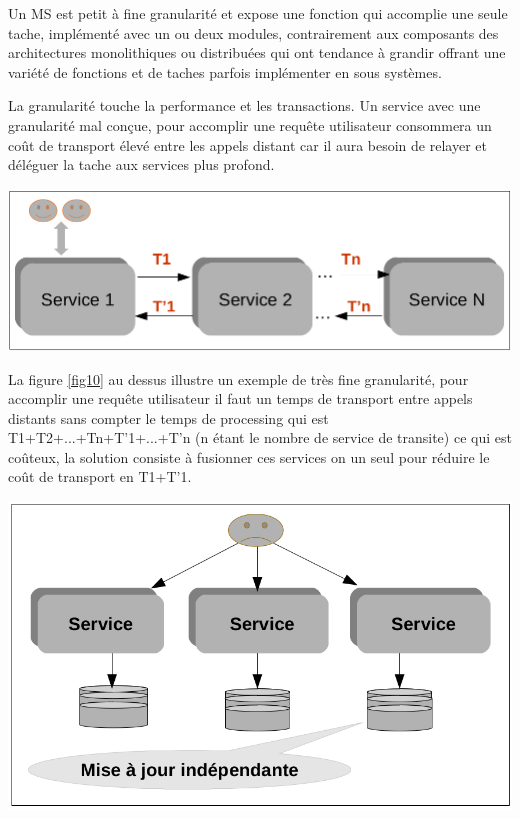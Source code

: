 \documentclass[12pt, a4paper, openany]{report}
\begin{document}
  Un MS est petit à fine granularité et expose une fonction qui accomplie une seule tache, implémenté avec un ou deux modules, contrairement aux composants des architectures monolithiques ou distribuées qui ont tendance à grandir offrant une variété de fonctions et de taches parfois implémenter en sous systèmes.
  
  La granularité touche la performance et les transactions. Un service avec une granularité mal conçue, pour accomplir une requête utilisateur consommera un coût de transport élevé entre les appels distant car il aura besoin de relayer et déléguer la tache aux services plus profond. 
  
   \begin{center}
     \includegraphics[scale=0.38]{impact_perform_10.png}
     \label{fig10}
   \end{center}
   
   La figure \ref{fig10} au dessus illustre un exemple de très fine granularité, pour accomplir une requête utilisateur il faut un temps de transport entre appels distants sans compter le temps de processing qui est T1+T2+...+Tn+T'1+...+T'n (n étant le nombre de service de transite) ce qui est coûteux, la solution consiste à fusionner ces services on un seul pour réduire le coût de transport en T1+T'1.\\
   
   \begin{center}
     \includegraphics[scale=0.35]{impact_transac_11.png}
     \label{fig11}
   \end{center}
   
\end{document}
